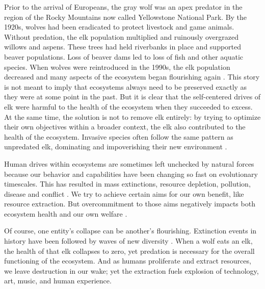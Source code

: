 \documentclass[12pt]{article}
\begin{document}
Prior to the arrival of Europeans, the gray wolf was an apex predator in the region of the Rocky Mountains now called Yellowstone National Park. By the 1920s, wolves had been eradicated to protect livestock and game animals. Without predation, the elk population multiplied and ruinously overgrazed willows and aspens. These trees had held riverbanks in place and supported beaver populations. Loss of beaver dams led to loss of fish and other aquatic species. When wolves were reintroduced in the 1990s, the elk population decreased and many aspects of the ecosystem began flourishing again \citep{ripple2012trophic}. This story is not meant to imply that ecosystems always need to be preserved exactly as they were at some point in the past. But it is clear that the self-centered drives of elk were harmful to the health of the ecosystem when they succeeded to excess. At the same time, the solution is not to remove elk entirely: by trying to optimize their own objectives within a broader context, the elk also contributed to the health of the ecosystem. Invasive species often follow the same pattern as unpredated elk, dominating and impoverishing their new environment \citep{pimentel2005update}.


Human drives within ecosystems are sometimes left unchecked by natural forces because our behavior and capabilities have been changing so fast on evolutionary timescales. This has resulted in mass extinctions, resource depletion, pollution, disease and conflict \citep{ceballos2015accelerated, kolbert2014sixth, rockstrom2009safe}. We try to achieve certain aims for our own benefit, like resource extraction. But overcommitment to those aims negatively impacts both ecosystem health and our own welfare \citep{shiva1993monocultures, bateson1972steps}.

Of course, one entity's collapse can be another's flourishing. Extinction events in history have been followed by waves of new diversity \citep{feng2017phylogenomics, jablonski2005mass, raup1994role}. When a wolf eats an elk, the health of that elk collapses to zero, yet predation is necessary for the overall functioning of the ecosystem. And as humans proliferate and extract resources, we leave destruction in our wake; yet the extraction fuels explosion of technology, art, music, and human experience.
\end{document}
